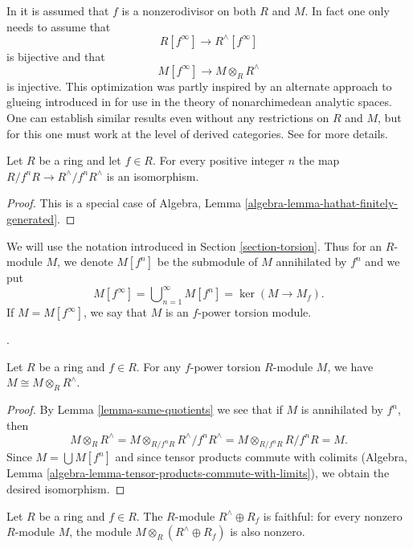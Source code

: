 \medskip\noindent
In \cite{Beauville-Laszlo} it is assumed that $f$ is a nonzerodivisor on
both $R$ and $M$. In fact one only needs to assume that
$$
R[f^\infty] \longrightarrow R^\wedge[f^\infty]
$$
is bijective and that
$$
M[f^\infty] \longrightarrow M \otimes_R R^\wedge
$$
is injective. This optimization was partly inspired by an alternate approach 
to glueing introduced in \cite[\S 1.3]{Kedlaya-Liu-I} for use in the theory of 
nonarchimedean analytic spaces.
One can establish similar results even without any restrictions on $R$ and $M$, 
but for this one must work at the level of derived categories. See
\cite[\S 5]{Bhatt-Algebraize} for more details.

\begin{lemma}
\label{lemma-same-quotients}
Let $R$ be a ring and let $f \in R$. For every positive integer $n$ the map
$R/f^nR \to R^\wedge/f^n R^\wedge$ is an isomorphism.
\end{lemma}

\begin{proof}
This is a special case of Algebra, Lemma
\ref{algebra-lemma-hathat-finitely-generated}.
\end{proof}

\noindent
We will use the notation introduced in Section \ref{section-torsion}.
Thus for an $R$-module $M$, we denote $M[f^n]$ be the submodule of
$M$ annihilated by  $f^n$ and we put
$$
M[f^\infty] = \bigcup\nolimits_{n = 1}^\infty M[f^n] = \ker(M \to M_f).
$$
If $M = M[f^\infty]$, we say that $M$ is an $f$-power torsion module.

\begin{lemma}
\label{lemma-torsion-completion}
\begin{reference}
\cite[Lemme~1]{Beauville-Laszlo}.
\end{reference}
Let $R$ be a ring and $f \in R$. For any $f$-power torsion $R$-module $M$,
we have $M \cong M \otimes_R R^\wedge$.
\end{lemma}

\begin{proof}
By Lemma \ref{lemma-same-quotients} we see that if $M$ is annihilated
by $f^n$, then
$$
M \otimes_R R^\wedge =
M \otimes_{R/f^nR} R^\wedge/f^n R^\wedge =
M \otimes_{R/f^nR} R/f^n R = M.
$$
Since $M = \bigcup M[f^n]$ and since tensor products commute
with colimits
(Algebra, Lemma \ref{algebra-lemma-tensor-products-commute-with-limits}),
we obtain the desired isomorphism.
\end{proof}

\begin{lemma}
\label{lemma-BL-faithful}
Let $R$ be a ring and $f \in R$.
The $R$-module $R^\wedge \oplus R_f$ is faithful: for every nonzero 
$R$-module $M$, the module $M \otimes_R (R^\wedge \oplus R_f)$
is also nonzero.
\end{lemma}

